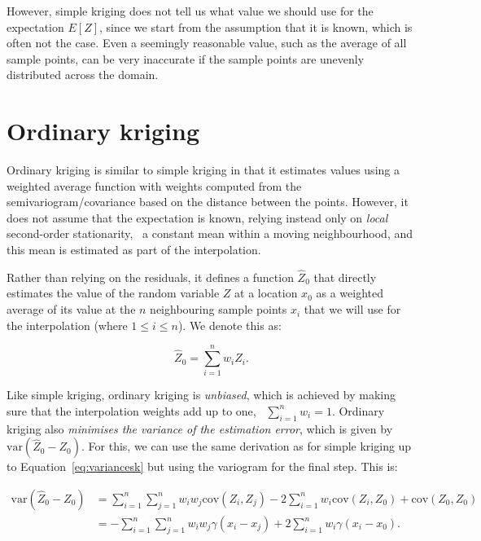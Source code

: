 However, simple kriging does not tell us what value we should use for the expectation \(E[Z]\), since we start from the assumption that it is known, which is often not the case.
Even a seemingly reasonable value, such as the average of all sample points, can be very inaccurate if the sample points are unevenly distributed across the domain.

\section{Ordinary kriging}%

Ordinary kriging is similar to simple kriging in that it estimates values using a weighted average function with weights computed from the semivariogram/covariance based on the distance between the points. 
However, it does not assume that the expectation is known, relying instead only on \emph{local} second-order stationarity, \ie\ a constant mean within a moving neighbourhood, and this mean is estimated as part of the interpolation.

Rather than relying on the residuals, it defines a function \(\hat{Z}_0\) that directly estimates the value of the random variable \(Z\) at a location \(x_0\) as a weighted average of its value at the \(n\) neighbouring sample points \(x_i\) that we will use for the interpolation (where \(1 \leq i \leq n\)).
We denote this as:

\begin{equation}
\label{eq:waok}
\hat{Z}_0 = \sum_{i=1}^n w_i Z_i.
\end{equation}

Like simple kriging, ordinary kriging is \emph{unbiased}, which is achieved by making sure that the interpolation weights add up to one, \ie\ \(\sum_{i=1}^n w_i = 1\).
Ordinary kriging also \emph{minimises the variance of the estimation error}, which is given by \(\mathrm{var}\left(\hat{Z}_0 - Z_0\right)\).
For this, we can use the same derivation as for simple kriging up to Equation~\ref{eq:variancesk} but using the variogram for the final step.
This is:

\begin{align}
\mathrm{var}\left(\hat{Z}_0 - Z_0\right) &= \sum_{i=1}^n \sum_{j=1}^n w_i w_j \mathrm{cov}(Z_i, Z_j) - 2\sum_{i=1}^n w_i \mathrm{cov}(Z_i,Z_0) + \mathrm{cov}(Z_0, Z_0) \nonumber \\
&= -\sum_{i=1}^n \sum_{j=1}^n w_i w_j \gamma(x_i-x_j) + 2\sum_{i=1}^n w_i \gamma(x_i-x_0).
\end{align}

